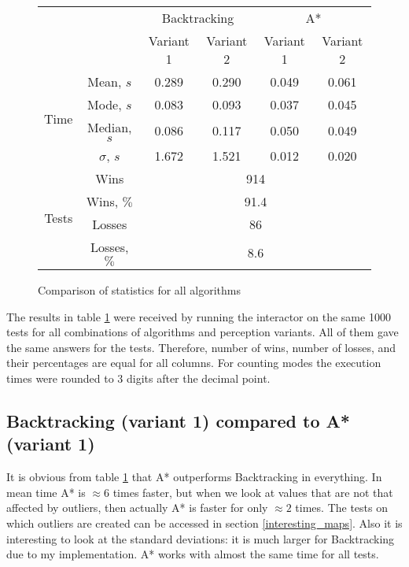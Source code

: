 \documentclass{article}
\begin{document}
\begin{figure}[H]
    \centering
    \begin{tabular}{c|c|c|c|c|c}
        \multicolumn{2}{c}{} & \multicolumn{2}{|c}{Backtracking} & \multicolumn{2}{|c}{A*} \\
        \cline{3-6}
        \multicolumn{2}{c|}{} & Variant 1 & Variant 2 & Variant 1 & Variant 2 \\
        \hline
        \hline
        \multirow{4}{*}{Time} & Mean, $s$ & 0.289 & 0.290 & 0.049 & 0.061 \\
        \cline{2-6}
        & Mode, $s$ & 0.083 & 0.093 & 0.037 & 0.045 \\
        \cline{2-6}
        & Median, $s$ & 0.086 & 0.117 & 0.050 & 0.049 \\
        \cline{2-6}
        & $\sigma$, $s$ & 1.672 & 1.521 & 0.012 & 0.020 \\
        \hline
        \multirow{4}{*}{Tests} & Wins & \multicolumn{4}{c}{914} \\
        \cline{2-6}
        & Wins, $\%$ & \multicolumn{4}{c}{91.4} \\
        \cline{2-6}
        & Losses & \multicolumn{4}{c}{86} \\
        \cline{2-6}
        & Losses, $\%$ & \multicolumn{4}{c}{8.6} \\
    \end{tabular}
    \caption{Comparison of statistics for all algorithms}
    \label{fig:statistics}
\end{figure}

The results in table \ref{fig:statistics} were received by running the interactor on the same 1000 tests for all combinations of algorithms and perception variants.
All of them gave the same answers for the tests.
Therefore, number of wins, number of losses, and their percentages are equal for all columns.
For counting modes the execution times were rounded to 3 digits after the decimal point.

\subsection{Backtracking (variant 1) compared to A* (variant 1)} \label{backtracking_1_vs_a_star_1}
It is obvious from table \ref{fig:statistics} that A* outperforms Backtracking in everything.
In mean time A* is $\approx 6$ times faster, but when we look at values that are not that affected by outliers, then actually A* is faster for only $\approx 2$ times.
The tests on which outliers are created can be accessed in section \ref{interesting_maps}.
Also it is interesting to look at the standard deviations: it is much larger for Backtracking due to my implementation. A* works with almost the same time for all tests.
\end{document}
